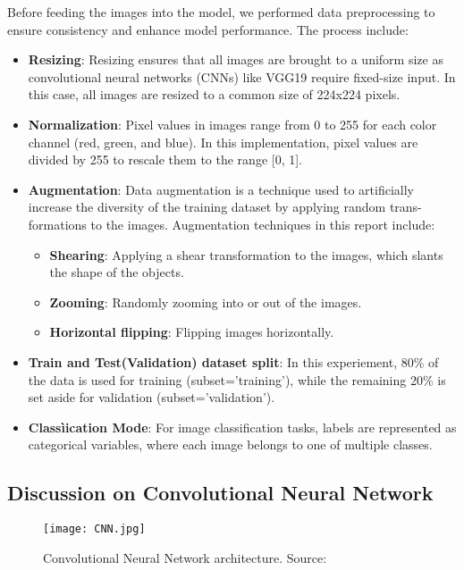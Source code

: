 \documentclass[12pt]{article}
\begin{document}
Before feeding the images into the model, we performed data preprocessing to ensure consistency and enhance model performance. The process include:

\begin{itemize}
  \item \textbf{Resizing}: Resizing ensures that all images are brought to a uniform size as convolutional neural networks (CNNs) like VGG19 require fixed-size input. In this case, all images are resized to a common size of 224x224 pixels.
  \item \textbf{Normalization}: Pixel values in images range from 0 to 255 for each color channel (red, green, and blue). In this implementation, pixel values are divided by 255 to rescale them to the range [0, 1].
  \item \textbf{Augmentation}: Data augmentation is a technique used to artificially increase the diversity of the training dataset by applying random trans-formations to the images. Augmentation techniques in this report include:
  \begin{itemize}
    \item \textbf{Shearing}: Applying a shear transformation to the images, which slants the shape of the objects.
    \item \textbf{Zooming}: Randomly zooming into or out of the images.
    \item \textbf{Horizontal flipping}: Flipping images horizontally.
  \end{itemize}
  \item \textbf{Train and Test(Validation) dataset split}: In this experiement, 80\% of the data is used for training (subset='training'), while the remaining 20\% is set aside for validation (subset='validation'). 
  \item \textbf{Classìication Mode}: For image classification tasks, labels are represented as categorical variables, where each image belongs to one of multiple classes.
  
\end{itemize}

\subsection{Discussion on Convolutional Neural Network}

    \begin{figure}[h]
        \centering
        \texttt{[image: CNN.jpg]}
        \caption{Convolutional Neural Network architecture. Source: \cite{article}}
        \label{fig:enter-label}
    \end{figure}
    
\end{document}
